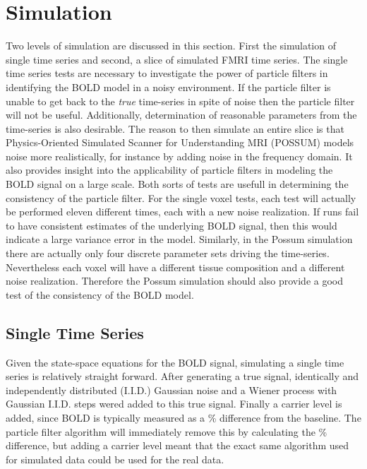 \chapter{Simulation}
\label{sec:SimulationResults}
Two levels of simulation are discussed in this section. First the simulation of single time series
and second, a slice of simulated FMRI time series. The single time series tests
are necessary to investigate the power of particle filters in 
identifying the BOLD model in a noisy environment. If the particle filter is unable
to get back to the \emph{true} time-series in spite of noise then the particle filter
will not be useful. Additionally, determination of reasonable parameters from the
time-series is also desirable. The reason to then simulate an entire slice is that
Physics-Oriented Simulated Scanner for Understanding MRI (POSSUM)
models noise more realistically, for instance by adding noise in the frequency domain. 
It also provides insight into the applicability of particle filters in modeling the BOLD 
signal on a large scale. Both sorts of tests are usefull in determining the
consistency of the particle filter. For the single voxel tests, each test will
actually be performed eleven different times, each with a new noise realization.
If runs fail to have consistent estimates of the underlying BOLD signal, then
this would indicate a large variance error in the model. Similarly, in the
Possum simulation there are actually only four discrete parameter sets driving the time-series.
Nevertheless each voxel will have a different tissue composition and a different
noise realization. Therefore the Possum simulation should also provide a good
test of the consistency of the BOLD model. 

\section{Single Time Series}
\label{sec:Single Voxel Simulation}
Given the state-space equations for the BOLD signal, simulating a single time 
series is relatively straight forward. After generating a true signal,
identically and independently distributed (I.I.D.) Gaussian noise and a Wiener
process with Gaussian I.I.D. steps wered added to this true signal. Finally a 
carrier level is added, since BOLD is typically
measured as a \% difference from the baseline. The particle filter
algorithm will immediately remove this by calculating the \% difference, 
but adding a carrier level meant that the exact same algorithm used 
for simulated data could be used for the real data. 

